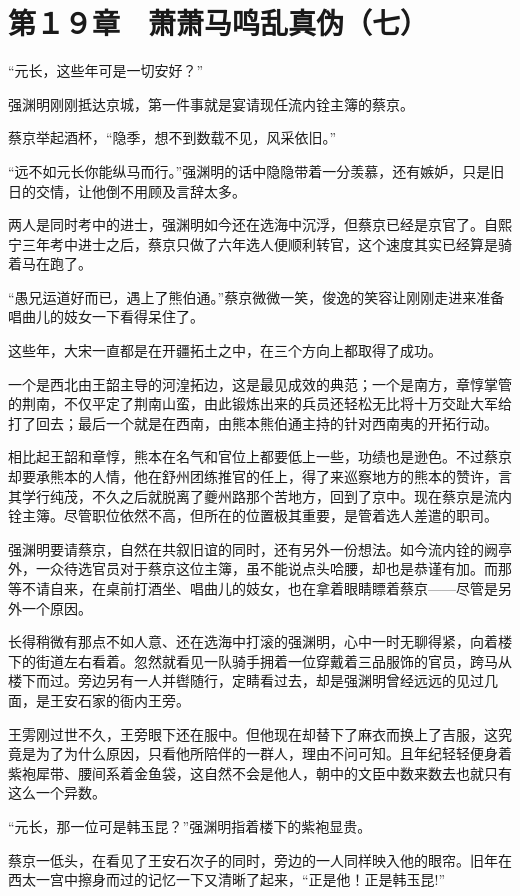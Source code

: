 \section{第１９章　萧萧马鸣乱真伪（七）}

“元长，这些年可是一切安好？”

强渊明刚刚抵达京城，第一件事就是宴请现任流内铨主簿的蔡京。

蔡京举起酒杯，“隐季，想不到数载不见，风采依旧。”

“远不如元长你能纵马而行。”强渊明的话中隐隐带着一分羡慕，还有嫉妒，只是旧日的交情，让他倒不用顾及言辞太多。

两人是同时考中的进士，强渊明如今还在选海中沉浮，但蔡京已经是京官了。自熙宁三年考中进士之后，蔡京只做了六年选人便顺利转官，这个速度其实已经算是骑着马在跑了。

“愚兄运道好而已，遇上了熊伯通。”蔡京微微一笑，俊逸的笑容让刚刚走进来准备唱曲儿的妓女一下看得呆住了。

这些年，大宋一直都是在开疆拓土之中，在三个方向上都取得了成功。

一个是西北由王韶主导的河湟拓边，这是最见成效的典范；一个是南方，章惇掌管的荆南，不仅平定了荆南山蛮，由此锻炼出来的兵员还轻松无比将十万交趾大军给打了回去；最后一个就是在西南，由熊本熊伯通主持的针对西南夷的开拓行动。

相比起王韶和章惇，熊本在名气和官位上都要低上一些，功绩也是逊色。不过蔡京却要承熊本的人情，他在舒州团练推官的任上，得了来巡察地方的熊本的赞许，言其学行纯茂，不久之后就脱离了夔州路那个苦地方，回到了京中。现在蔡京是流内铨主簿。尽管职位依然不高，但所在的位置极其重要，是管着选人差遣的职司。

强渊明要请蔡京，自然在共叙旧谊的同时，还有另外一份想法。如今流内铨的阙亭外，一众待选官员对于蔡京这位主簿，虽不能说点头哈腰，却也是恭谨有加。而那等不请自来，在桌前打酒坐、唱曲儿的妓女，也在拿着眼睛瞟着蔡京——尽管是另外一个原因。

长得稍微有那点不如人意、还在选海中打滚的强渊明，心中一时无聊得紧，向着楼下的街道左右看着。忽然就看见一队骑手拥着一位穿戴着三品服饰的官员，跨马从楼下而过。旁边另有一人并辔随行，定睛看过去，却是强渊明曾经远远的见过几面，是王安石家的衙内王旁。

王雱刚过世不久，王旁眼下还在服中。但他现在却替下了麻衣而换上了吉服，这究竟是为了为什么原因，只看他所陪伴的一群人，理由不问可知。且年纪轻轻便身着紫袍犀带、腰间系着金鱼袋，这自然不会是他人，朝中的文臣中数来数去也就只有这么一个异数。

“元长，那一位可是韩玉昆？”强渊明指着楼下的紫袍显贵。

蔡京一低头，在看见了王安石次子的同时，旁边的一人同样映入他的眼帘。旧年在西太一宫中擦身而过的记忆一下又清晰了起来，“正是他！正是韩玉昆!”

